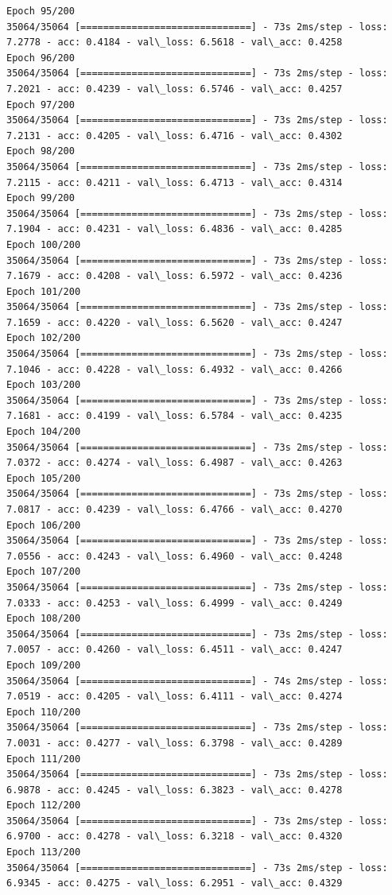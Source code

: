 \documentclass[11pt]{article}
\begin{document}
\begin{Verbatim}[commandchars=\\\{\}]
Epoch 95/200
35064/35064 [==============================] - 73s 2ms/step - loss: 7.2778 - acc: 0.4184 - val\_loss: 6.5618 - val\_acc: 0.4258
Epoch 96/200
35064/35064 [==============================] - 73s 2ms/step - loss: 7.2021 - acc: 0.4239 - val\_loss: 6.5746 - val\_acc: 0.4257
Epoch 97/200
35064/35064 [==============================] - 73s 2ms/step - loss: 7.2131 - acc: 0.4205 - val\_loss: 6.4716 - val\_acc: 0.4302
Epoch 98/200
35064/35064 [==============================] - 73s 2ms/step - loss: 7.2115 - acc: 0.4211 - val\_loss: 6.4713 - val\_acc: 0.4314
Epoch 99/200
35064/35064 [==============================] - 73s 2ms/step - loss: 7.1904 - acc: 0.4231 - val\_loss: 6.4836 - val\_acc: 0.4285
Epoch 100/200
35064/35064 [==============================] - 73s 2ms/step - loss: 7.1679 - acc: 0.4208 - val\_loss: 6.5972 - val\_acc: 0.4236
Epoch 101/200
35064/35064 [==============================] - 73s 2ms/step - loss: 7.1659 - acc: 0.4220 - val\_loss: 6.5620 - val\_acc: 0.4247
Epoch 102/200
35064/35064 [==============================] - 73s 2ms/step - loss: 7.1046 - acc: 0.4228 - val\_loss: 6.4932 - val\_acc: 0.4266
Epoch 103/200
35064/35064 [==============================] - 73s 2ms/step - loss: 7.1681 - acc: 0.4199 - val\_loss: 6.5784 - val\_acc: 0.4235
Epoch 104/200
35064/35064 [==============================] - 73s 2ms/step - loss: 7.0372 - acc: 0.4274 - val\_loss: 6.4987 - val\_acc: 0.4263
Epoch 105/200
35064/35064 [==============================] - 73s 2ms/step - loss: 7.0817 - acc: 0.4239 - val\_loss: 6.4766 - val\_acc: 0.4270
Epoch 106/200
35064/35064 [==============================] - 73s 2ms/step - loss: 7.0556 - acc: 0.4243 - val\_loss: 6.4960 - val\_acc: 0.4248
Epoch 107/200
35064/35064 [==============================] - 73s 2ms/step - loss: 7.0333 - acc: 0.4253 - val\_loss: 6.4999 - val\_acc: 0.4249
Epoch 108/200
35064/35064 [==============================] - 73s 2ms/step - loss: 7.0057 - acc: 0.4260 - val\_loss: 6.4511 - val\_acc: 0.4247
Epoch 109/200
35064/35064 [==============================] - 74s 2ms/step - loss: 7.0519 - acc: 0.4205 - val\_loss: 6.4111 - val\_acc: 0.4274
Epoch 110/200
35064/35064 [==============================] - 73s 2ms/step - loss: 7.0031 - acc: 0.4277 - val\_loss: 6.3798 - val\_acc: 0.4289
Epoch 111/200
35064/35064 [==============================] - 73s 2ms/step - loss: 6.9878 - acc: 0.4245 - val\_loss: 6.3823 - val\_acc: 0.4278
Epoch 112/200
35064/35064 [==============================] - 73s 2ms/step - loss: 6.9700 - acc: 0.4278 - val\_loss: 6.3218 - val\_acc: 0.4320
Epoch 113/200
35064/35064 [==============================] - 73s 2ms/step - loss: 6.9345 - acc: 0.4275 - val\_loss: 6.2951 - val\_acc: 0.4329

\end{Verbatim}
\end{document}
